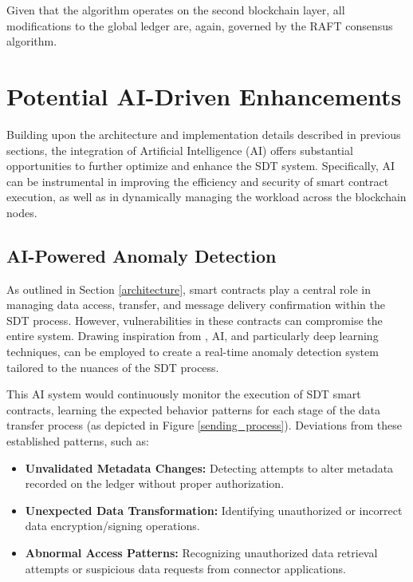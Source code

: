 \documentclass[10pt]{llncs}
\begin{document}
Given that the algorithm operates on the second blockchain layer, all modifications to the global ledger are, again, governed by the RAFT consensus algorithm.


\section{Potential AI-Driven Enhancements}\label{ai_enhancements}

Building upon the architecture and implementation details described in previous sections, the integration of Artificial Intelligence (AI) offers substantial opportunities to further optimize 
and enhance the SDT system. 
Specifically, AI can be instrumental in improving the efficiency and security of smart contract execution, as well as in dynamically managing the workload across the blockchain nodes.

\subsection{AI-Powered Anomaly Detection}

As outlined in Section \ref{architecture}, smart contracts play a central role in managing data access, transfer, and message delivery confirmation within the SDT process. 
However, vulnerabilities in these contracts can compromise the entire system. 
Drawing inspiration from \cite{Demertzis2020}, AI, and particularly deep learning techniques, can be employed to create a real-time anomaly detection system tailored to the nuances of the SDT process.

This AI system would continuously monitor the execution of SDT smart contracts, learning the expected behavior patterns for each stage of the data transfer process (as depicted in Figure \ref{sending_process}). 
Deviations from these established patterns, such as:

\begin{itemize}
    \item \textbf{Unvalidated Metadata Changes:} Detecting attempts to alter metadata recorded on the ledger without proper authorization.
    \item \textbf{Unexpected Data Transformation:} Identifying unauthorized or incorrect data encryption/signing operations.
    \item \textbf{Abnormal Access Patterns:} Recognizing unauthorized data retrieval attempts or suspicious data requests from connector applications.
\end{itemize}
\end{document}
